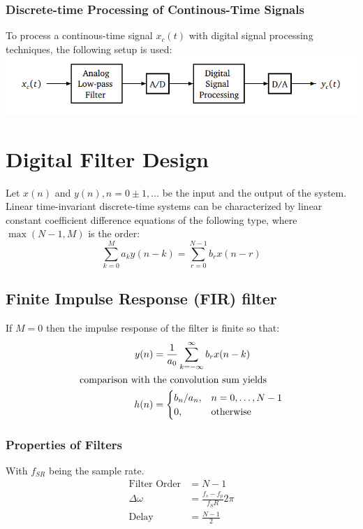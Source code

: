 \documentclass[accentcolor=tud4c,9.5pt,nochapname,bigchapter,paper=a5report]{tudreport}
\begin{document}
\subsection{Discrete-time Processing of Continous-Time Signals}
To process a continous-time signal $x_c(t)$ with digital signal processing techniques, the following setup is used:\\
\includegraphics[width=\textwidth]{images/dsp_setup.png}

\chapter{Digital Filter Design}

Let $x(n)$ and $y(n) , n=0\pm 1,\ldots$ be the input and the output of the system.  
Linear time-invariant discrete-time systems can be characterized 
 by linear constant coefficient difference equations of the following type, where $\max(N-1,M)$ is the order:
 \begin {equation}
 \sum\limits_{k=0}^{M}a_ky(n-k)= \sum\limits_{r=0}^{N-1} b_r x(n-r)
 \end{equation}
\section{Finite Impulse Response (FIR) filter}
If $M=0$ then the impulse response of the filter is finite so that:
\begin{subequations}
\begin{align}
y(n) &= \frac{1}{a_0}\sum\limits_{k=-\infty}^{\infty}b_r x(n-k) \\
\text{comparison with } &\text{the convolution sum yields} \notag \\
h(n) &= \begin{cases}
b_n/a_n, &n=0,\ldots,N-1\\
0, &\text{otherwise}
\end{cases}
\end{align}
\end{subequations}
\subsection{Properties of Filters}
With $f_{SR}$ being the sample rate.
\begin{align}
\text{Filter Order}&=N-1\\
\Delta\omega &= \frac{f_s-f_p}{f_SR} 2\pi\\
\text{Delay} &=\frac{N-1}{2}
\end{align}
\end{document}

